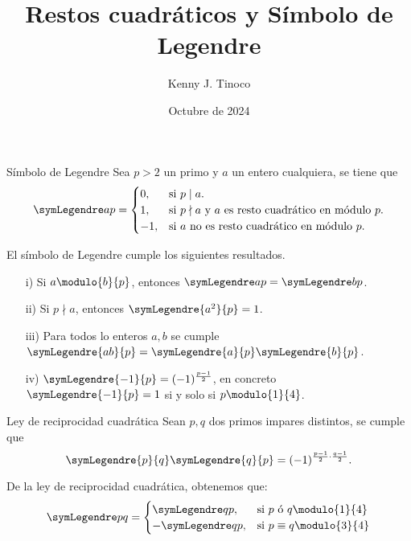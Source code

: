 \documentclass[12pt]{article}
\title{Restos cuadráticos y Símbolo de Legendre}
\author{Kenny J. Tinoco}
\date{Octubre de 2024}
\begin{document}
   \maketitle
   \begin{definition.box}{Símbolo de Legendre}{}
      Sea $p> 2$ un primo y $a$ un entero cualquiera, se tiene que
      \[
         \symLegendre a p =
         \begin{cases}
            0, &\text{si}\ p \mid a.\\
            1, &\text{si}\ p \nmid a \ \text{y}\ a \ \text{es resto cuadrático en módulo}\ p.\\
            -1,&\text{si}\ a \ \text{no es resto cuadrático en módulo}\ p.\\
         \end{cases}
      \]
   \end{definition.box}

   \begin{lemma}
      El símbolo de Legendre cumple los siguientes resultados.
      \begin{enumerate}
         \item [i)] Si $a \modulo{b}{p}$, entonces $\symLegendre a p = \symLegendre b p$.
         \item [ii)] Si $p \nmid a$, entonces $\symLegendre{a^2}{p} = 1$.
         \item [iii)] Para todos lo enteros $a,b$ se cumple $\symLegendre{ab}{p} = \symLegendre{a}{p} \symLegendre{b}{p}$.
         \item [iv)] $\symLegendre{-1}{p} = (-1)^{\frac{p - 1}{2}}$, en concreto $\symLegendre{-1}{p} = 1$ si y solo si $p \modulo{1}{4}$.
      \end{enumerate}
   \end{lemma}

   \begin{theorem.box}{Ley de reciprocidad cuadrática}{}
      Sean $p, q$ dos primos impares distintos, se cumple que
      \[
         \symLegendre{p}{q} \symLegendre{q}{p} = (-1)^{\frac{p - 1}{2} \cdot \frac{q - 1}{2}}.
      \]
   \end{theorem.box}

   \begin{remark.box}{}{}
      De la ley de reciprocidad cuadrática, obtenemos que:
      \[
         \symLegendre p q =
         \begin{cases}
            \symLegendre q p, &\text{si}\ p\ \text{ó}\ q \modulo{1}{4}\\
            - \symLegendre q p, &\text{si}\ p \equiv q \modulo{3}{4}
         \end{cases}
      \]
   \end{remark.box}
\end{document}
